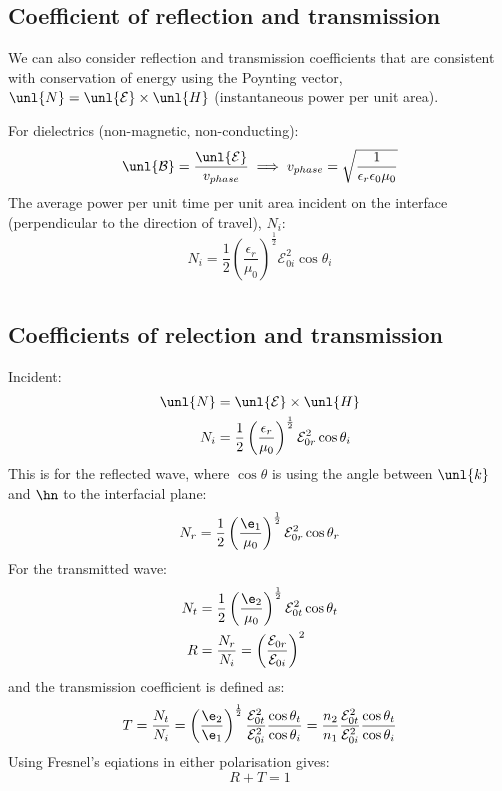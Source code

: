 \documentclass[a4paper, 11pt, normalem]{report}
\renewcommand\E{\mathcal{E}}
\newcommand\uE{\unl{\E}}
\renewcommand\B{\mathcal{B}}
\newcommand\uB{\unl{\B}}
\newcommand\eno{\epsilon_0}
\newcommand\vk{\unl{k}}
\newcommand\er{\epsilon_r}
\begin{document}
\section{Coefficient of reflection and transmission}
We can also consider reflection and transmission coefficients that are consistent with conservation of energy using the Poynting vector, $\unl{N} = \uE \times \unl{H}$ (instantaneous power per unit area).

For dielectrics (non-magnetic, non-conducting):
\begin{equation}
	\uB = \frac{\uE}{v_{phase}} \implies v_{phase} = \sqrt{\frac{1}{\er\eno\mu_0}}
\end{equation}
The average power per unit time per unit area incident on the interface (perpendicular to the direction of travel), $N_i$:
\begin{equation}
	N_i = \frac{1}{2}\left(\frac{\er}{\mu_0}\right)^{\frac{1}{2}} \E_{0i}^2\cos\theta_i
\end{equation}

\chapter{}
\section{Coefficients of relection and transmission}
Incident:
\begin{align}
	\unl{N} &= \uE \times \unl{H} \\
	N_i &= \frac{1}{2}\left(\frac{\er}{\mu_0}\right)^{\frac{1}{2}} \E_{0r}^2\cos\theta_i
\end{align}
This is for the reflected wave, where $\cos\theta$ is using the angle between $\vk$ and $\hn$ to the interfacial plane:
\begin{equation}
	N_r = \frac{1}{2}\left(\frac{\e_1}{\mu_0}\right)^{\frac{1}{2}} \E_{0r}^2\cos\theta_r
\end{equation}
For the transmitted wave:
\begin{align}
	N_t &= \frac{1}{2}\left(\frac{\e_2}{\mu_0}\right)^{\frac{1}{2}} \E_{0t}^2\cos\theta_t \\
	R &= \frac{N_r}{N_i} = \left(\frac{\E_{0r}}{\E_{0i}}\right)^2
\end{align}
and the transmission coefficient is defined as:
\begin{equation}
	T = \frac{N_t}{N_i} = \left(\frac{\e_2}{\e_1}\right)^{\frac{1}{2}}\frac{\E_{0t}^2}{\E_{0i}^2} \frac{\cos\theta_t}{\cos\theta_i} = \frac{n_2}{n_1}\frac{\E_{0t}^2}{\E_{0i}^2} \frac{\cos\theta_t}{\cos\theta_i}
\end{equation}
Using Fresnel's eqiations in either polarisation gives:
\begin{equation}
	R + T = 1
\end{equation}
\end{document}
